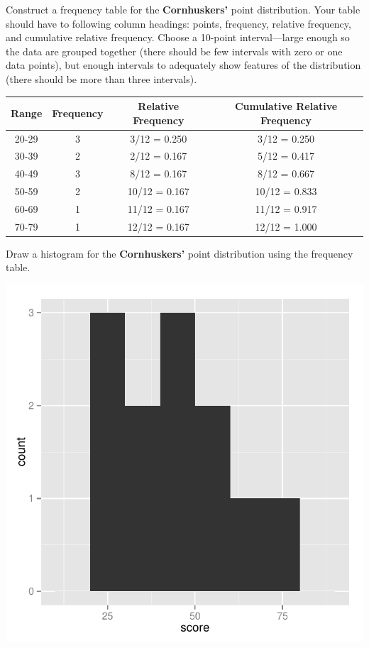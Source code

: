 \documentclass[11pt]{article}\usepackage[]{graphicx}\usepackage[]{color}
\makeatletter
\def\maxwidth{ %
  \ifdim\Gin@nat@width>\linewidth
    \linewidth
  \else
    \Gin@nat@width
  \fi
}
\newenvironment{knitrout}{}{} %
\makeatother
\begin{document}
\item Construct a frequency table for the \textbf{Cornhuskers'} point distribution. Your table should have to following column headings: points, frequency, relative frequency, and cumulative relative frequency. Choose a 10-point interval---large enough so the data are grouped together (there should be few intervals with zero or one data points), but enough intervals to adequately show features of the distribution (there should be more than three intervals).

\begin{center}
\begin{tabular}{cccc}\hline
   Range & Frequency & Relative Frequency & Cumulative Relative Frequency \\ \hline 
   20-29 & 3 & 3/12 = 0.250 & 3/12 = 0.250 \\ 
   30-39 & 2 & 2/12 = 0.167 & 5/12 = 0.417 \\ 
   40-49 & 3 & 8/12 = 0.167 & 8/12 = 0.667 \\ 
   50-59 & 2 & 10/12 = 0.167 & 10/12 = 0.833 \\ 
   60-69 & 1 & 11/12 = 0.167 & 11/12 = 0.917 \\ 
   70-79 & 1 & 12/12 = 0.167 & 12/12 = 1.000 \\ \hline
\end{tabular}
\end{center}

\item Draw a histogram for the \textbf{Cornhuskers'} point distribution using the frequency table.

\begin{center}
\begin{knitrout}
\color{fgcolor}
\includegraphics[width=.5\maxwidth]{figure/hsito-1} 

\end{knitrout}
\end{center}
\end{document}
